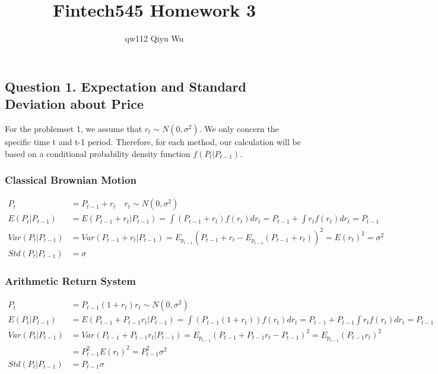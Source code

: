 \documentclass[a4paper,12pt]{article}
\title{Fintech545 Homework 3}
\author{qw112 Qiyu Wu}
\date{}
\begin{document}
\maketitle
\subsection*{Question 1. Expectation and Standard Deviation about Price}
For the problemset 1, we assume that $r_{t}\sim N(0,\sigma^2)$. We only concern the specific time t and t-1 period.
Therefore, for each method, our calculation will be based on a conditional probability density function $f(P_{t}|P_{t-1})$.

\subsubsection*{Classical Brownian Motion}
\begin{displaymath}
    \begin{split}
        P_t &= P_{t-1} + r_{t} \quad r_{t}\sim N(0,\sigma^2)\\
        E(P_t|P_{t-1}) &= E(P_{t-1}+r_{t}|P_{t-1}) = \int (P_{t-1}+r_{t})f(r_{t})dr_{t} = P_{t-1} + \int r_{t}f(r_{t})dr_{t} = P_{t-1}\\
        Var(P_t|P_{t-1}) &= Var(P_{t-1}+r_{t}|P_{t-1}) = E_{p_{t-1}}(P_{t-1}+r_{t}-E_{p_{t-1}}(P_{t-1}+r_{t}))^{2} = E(r_{t})^2 = \sigma^{2}\\
        Std(P_t|P_{t-1}) &= \sigma
    \end{split}
\end{displaymath}

\subsubsection*{Arithmetic Return System}
\begin{displaymath}
    \begin{split}
        P_t &= P_{t-1}(1+r_{t}) r_{t} \sim N(0,\sigma^2)\\
        E(P_t|P_{t-1}) &= E(P_{t-1}+P_{t-1}r_{t}|P_{t-1})=  \int (P_{t-1}(1+r_{t}))f(r_{t})dr_{t} = P_{t-1}+P_{t-1}\int r_{t}f(r_{t})dr_{t} = P_{t-1}\\
        Var(P_t|P_{t-1}) &= Var(P_{t-1}+P_{t-1}r_{t}|P_{t-1}) = E_{p_{t-1}}(P_{t-1}+P_{t-1}r_{t}-P_{t-1})^{2} = E_{p_{t-1}}(P_{t-1}r_{t})^2\\
         &= P_{t-1}^{2}E(r_{t})^{2} = P_{t-1}^{2}\sigma^{2}\\
        Std(P_t|P_{t-1}) &= P_{t-1}\sigma
    \end{split}
\end{displaymath}
\end{document}
